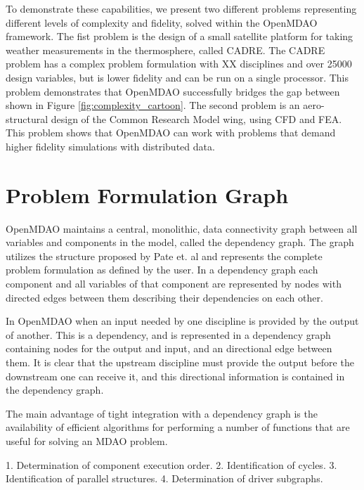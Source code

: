 \documentclass[]{aiaa-tc} %
\begin{document}
    To demonstrate these capabilities, we present two different problems representing different levels of 
    complexity and fidelity, solved within the OpenMDAO framework. The fist problem is the design of a small 
    satellite platform for taking weather measurements in the thermosphere, called CADRE. The CADRE problem has a 
    complex problem formulation with XX disciplines and over 25000 design variables, but is lower fidelity and can 
    be run on a single processor. This problem demonstrates that OpenMDAO successfully bridges the gap between shown 
    in Figure \ref{fig:complexity_cartoon}. The second problem is an aero-structural design of the Common Research 
    Model wing, using CFD and FEA. This problem shows that OpenMDAO can work with problems that demand higher fidelity 
    simulations with distributed data. 

  \section{Problem Formulation Graph}


    OpenMDAO maintains a central, monolithic, data connectivity graph between all 
    variables and components in the model, called the dependency graph. The graph utilizes the structure proposed by 
    Pate et. al \cite{graph_problem2013} and represents the complete problem formulation as 
    defined by the user. In a dependency graph each component and all variables of that component are 
    represented by nodes with directed edges between them describing their dependencies on each other. 

    In OpenMDAO when an input needed by one discipline is provided by the output of another. This is a dependency, and is represented 
    in a dependency graph containing nodes for the output and input, and an directional edge
    between them. It is clear that the upstream discipline must provide the output before the 
    downstream one can receive it, and this directional information is contained in the dependency
    graph.

    The main advantage of tight integration with a dependency graph is the availability of efficient
    algorithms for performing a number of functions that are useful for solving an MDAO problem.

      1. Determination of component execution order.
      2. Identification of cycles.
      3. Identification of parallel structures.
      4. Determination of driver subgraphs.
      
\end{document}
